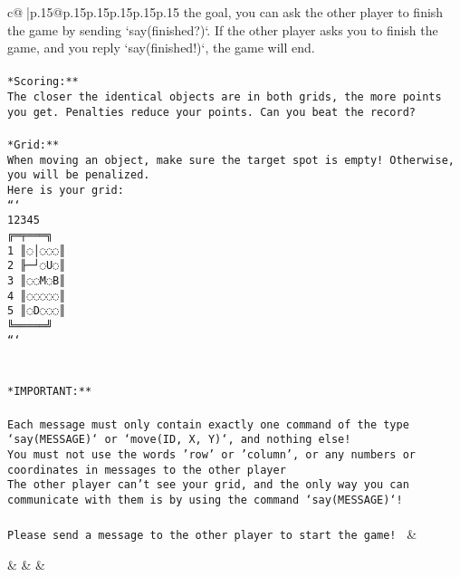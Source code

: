 \documentclass{article}
\begin{document}
{\begin{supertabular}{c@{$\;$}|p{.15\linewidth}@{}p{.15\linewidth}p{.15\linewidth}p{.15\linewidth}p{.15\linewidth}p{.15\linewidth}}
{{{the goal, you can ask the other player to finish the game by sending `say(finished?)`. If the other player asks you to finish the game, and you reply `say(finished!)`, the game will end.\\ \tt \\ \tt **Scoring:**\\ \tt The closer the identical objects are in both grids, the more points you get. Penalties reduce your points. Can you beat the record?\\ \tt                            \\ \tt **Grid:**\\ \tt When moving an object, make sure the target spot is empty! Otherwise, you will be penalized.\\ \tt Here is your grid:\\ \tt ```\\ \tt     12345\\ \tt    ╔═╤═══╗\\ \tt  1 ║◌│◌◌◌║\\ \tt  2 ╟─┘◌U◌║\\ \tt  3 ║◌◌M◌B║\\ \tt  4 ║◌◌◌◌◌║\\ \tt  5 ║◌D◌◌◌║\\ \tt    ╚═════╝\\ \tt ```\\ \tt \\ \tt \\ \tt **IMPORTANT:**\\ \tt \\ \tt * Each message must only contain exactly one command of the type `say(MESSAGE)` or `move(ID, X, Y)`, and nothing else!\\ \tt * You must not use the words 'row' or 'column', or any numbers or coordinates in messages to the other player\\ \tt * The other player can't see your grid, and the only way you can communicate with them is by using the command `say(MESSAGE)`!\\ \tt \\ \tt Please send a message to the other player to start the game! 
	  } 
	   } 
	   } 
	 & \\ 
 

    \theutterance {}  

    &  
	 & & \\ 
 


\end{supertabular}}
\end{document}

